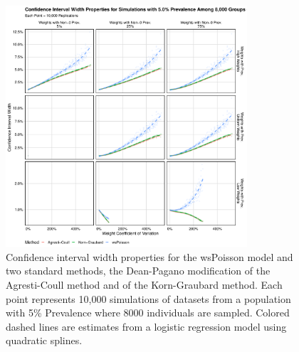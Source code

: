\documentclass[AMA,STIX1COL]{WileyNJD-v2}
\begin{document}
\begin{figure}
\centering
\includegraphics[width=0.8\textwidth]{figures/perfect_confidence_interval_width_8000_groups_0_05_prev}
\caption{Confidence interval width properties for the wsPoisson model and two standard methods, the Dean-Pagano modification of the Agresti-Coull method and of the Korn-Graubard method.
Each point represents 10,000 simulations of datasets from a population with 5\% Prevalence where 8000 individuals are sampled.
Colored dashed lines are estimates from a logistic regression model using quadratic splines.}
\label{fig:perfect_confidence_interval_width_8000_groups_0_05_prev}
\end{figure}

\end{document}
